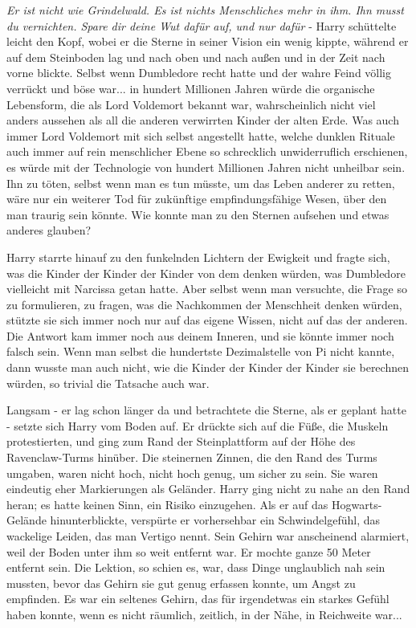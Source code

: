 \emph{Er ist nicht wie Grindelwald. Es ist nichts Menschliches mehr in ihm. Ihn
musst du vernichten. Spare dir deine Wut dafür auf, und nur dafür} - Harry
schüttelte leicht den Kopf, wobei er die Sterne in seiner Vision ein wenig
kippte, während er auf dem Steinboden lag und nach oben und nach außen und in
der Zeit nach vorne blickte. Selbst wenn Dumbledore recht hatte und der wahre
Feind völlig verrückt und böse war... in hundert Millionen Jahren würde die
organische Lebensform, die als Lord Voldemort bekannt war, wahrscheinlich nicht
viel anders aussehen als all die anderen verwirrten Kinder der alten Erde. Was
auch immer Lord Voldemort mit sich selbst angestellt hatte, welche dunklen
Rituale auch immer auf rein menschlicher Ebene so schrecklich unwiderruflich
erschienen, es würde mit der Technologie von hundert Millionen Jahren nicht
unheilbar sein. Ihn zu töten, selbst wenn man es tun müsste, um das Leben
anderer zu retten, wäre nur ein weiterer Tod für zukünftige empfindungsfähige
Wesen, über den man traurig sein könnte. Wie konnte man zu den Sternen aufsehen
und etwas anderes glauben?

Harry starrte hinauf zu den funkelnden Lichtern der Ewigkeit und fragte sich,
was die Kinder der Kinder der Kinder von dem denken würden, was Dumbledore
vielleicht mit Narcissa getan hatte. Aber selbst wenn man versuchte, die Frage
so zu formulieren, zu fragen, was die Nachkommen der Menschheit denken würden,
stützte sie sich immer noch nur auf das eigene Wissen, nicht auf das der
anderen. Die Antwort kam immer noch aus deinem Inneren, und sie könnte immer
noch falsch sein. Wenn man selbst die hundertste Dezimalstelle von Pi nicht
kannte, dann wusste man auch nicht, wie die Kinder der Kinder der Kinder sie
berechnen würden, so trivial die Tatsache auch war.

Langsam - er lag schon länger da und betrachtete die Sterne, als er geplant
hatte - setzte sich Harry vom Boden auf. Er drückte sich auf die Füße, die
Muskeln protestierten, und ging zum Rand der Steinplattform auf der Höhe des
Ravenclaw-Turms hinüber. Die steinernen Zinnen, die den Rand des Turms umgaben,
waren nicht hoch, nicht hoch genug, um sicher zu sein. Sie waren eindeutig eher
Markierungen als Geländer. Harry ging nicht zu nahe an den Rand heran; es hatte
keinen Sinn, ein Risiko einzugehen. Als er auf das Hogwarts-Gelände
hinunterblickte, verspürte er vorhersehbar ein Schwindelgefühl, das wackelige
Leiden, das man Vertigo nennt. Sein Gehirn war anscheinend alarmiert, weil der
Boden unter ihm so weit entfernt war. Er mochte ganze 50 Meter entfernt sein.
Die Lektion, so schien es, war, dass Dinge unglaublich nah sein mussten, bevor
das Gehirn sie gut genug erfassen konnte, um Angst zu empfinden. Es war ein
seltenes Gehirn, das für irgendetwas ein starkes Gefühl haben konnte, wenn es
nicht räumlich, zeitlich, in der Nähe, in Reichweite war...

